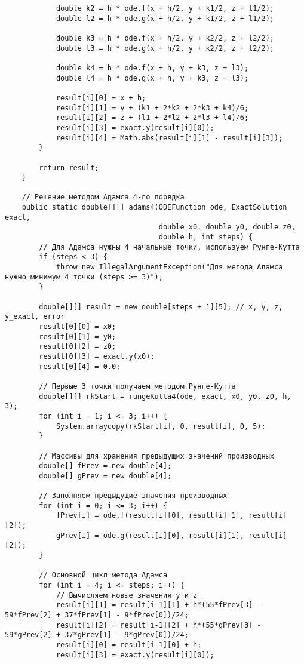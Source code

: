 \begin{verbatim}
            double k2 = h * ode.f(x + h/2, y + k1/2, z + l1/2);
            double l2 = h * ode.g(x + h/2, y + k1/2, z + l1/2);

            double k3 = h * ode.f(x + h/2, y + k2/2, z + l2/2);
            double l3 = h * ode.g(x + h/2, y + k2/2, z + l2/2);

            double k4 = h * ode.f(x + h, y + k3, z + l3);
            double l4 = h * ode.g(x + h, y + k3, z + l3);

            result[i][0] = x + h;
            result[i][1] = y + (k1 + 2*k2 + 2*k3 + k4)/6;
            result[i][2] = z + (l1 + 2*l2 + 2*l3 + l4)/6;
            result[i][3] = exact.y(result[i][0]);
            result[i][4] = Math.abs(result[i][1] - result[i][3]);
        }

        return result;
    }

    // Решение методом Адамса 4-го порядка
    public static double[][] adams4(ODEFunction ode, ExactSolution exact,
                                    double x0, double y0, double z0,
                                    double h, int steps) {
        // Для Адамса нужны 4 начальные точки, используем Рунге-Кутта
        if (steps < 3) {
            throw new IllegalArgumentException("Для метода Адамса нужно минимум 4 точки (steps >= 3)");
        }

        double[][] result = new double[steps + 1][5]; // x, y, z, y_exact, error
        result[0][0] = x0;
        result[0][1] = y0;
        result[0][2] = z0;
        result[0][3] = exact.y(x0);
        result[0][4] = 0.0;

        // Первые 3 точки получаем методом Рунге-Кутта
        double[][] rkStart = rungeKutta4(ode, exact, x0, y0, z0, h, 3);
        for (int i = 1; i <= 3; i++) {
            System.arraycopy(rkStart[i], 0, result[i], 0, 5);
        }

        // Массивы для хранения предыдущих значений производных
        double[] fPrev = new double[4];
        double[] gPrev = new double[4];

        // Заполняем предыдущие значения производных
        for (int i = 0; i <= 3; i++) {
            fPrev[i] = ode.f(result[i][0], result[i][1], result[i][2]);
            gPrev[i] = ode.g(result[i][0], result[i][1], result[i][2]);
        }

        // Основной цикл метода Адамса
        for (int i = 4; i <= steps; i++) {
            // Вычисляем новые значения y и z
            result[i][1] = result[i-1][1] + h*(55*fPrev[3] - 59*fPrev[2] + 37*fPrev[1] - 9*fPrev[0])/24;
            result[i][2] = result[i-1][2] + h*(55*gPrev[3] - 59*gPrev[2] + 37*gPrev[1] - 9*gPrev[0])/24;
            result[i][0] = result[i-1][0] + h;
            result[i][3] = exact.y(result[i][0]);


\end{verbatim}
